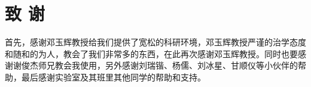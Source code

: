\frontmatter {}  %

\chapter*{致\texorpdfstring{\qquad}{} 谢}
\thispagestyle{main}
\par 首先，感谢邓玉辉教授给我们提供了宽松的科研环境，邓玉辉教授严谨的治学态度和随和的为人，教会了我们非常多的东西，在此再次感谢邓玉辉教授。同时也要感谢谢俊杰师兄教会我使用\LaTeXe{}，另外感谢刘瑞锴、杨儒、刘冰星、甘顺仪等小伙伴的帮助，最后感谢实验室及其班里其他同学的帮助和支持。
